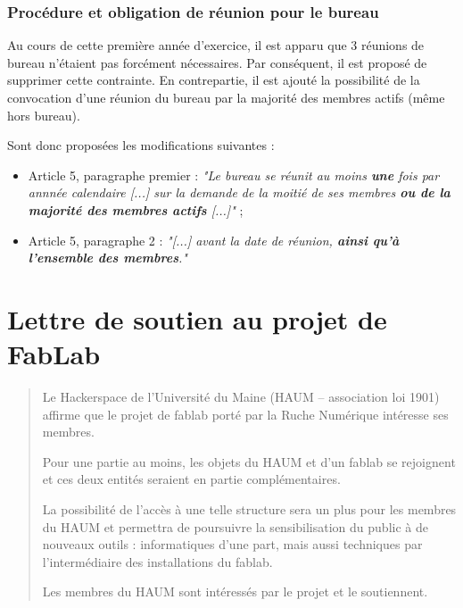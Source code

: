 \documentclass[11pt]{article}
\begin{document}
\subsubsection{Procédure et obligation de réunion pour le bureau}

Au cours de cette première année d'exercice, il est apparu que 3 réunions de bureau n'étaient pas forcément nécessaires. Par conséquent, il est proposé de supprimer cette contrainte. En contrepartie, il est ajouté la possibilité de la convocation d'une réunion du bureau par la majorité des membres actifs (même hors bureau).

Sont donc proposées les modifications suivantes :

\begin{itemize}
	\item Article 5, paragraphe premier : \textit{"Le bureau se réunit au moins \textbf{une} fois par annnée calendaire [...] sur la demande de la moitié de ses membres \textbf{ou de la majorité des membres actifs} [...]"} ;
    \item Article 5, paragraphe 2 : \textit{"[...] avant la date de réunion, \textbf{ainsi qu'à l'ensemble des membres}."}
\end{itemize}

\appendix %

\section*{Lettre de soutien au projet de FabLab}

\begin{quotation}
    Le Hackerspace de l'Université du Maine (HAUM -- association loi 1901) affirme que le projet de fablab porté par la
    Ruche Numérique intéresse ses membres.

    Pour une partie au moins, les objets du HAUM et d'un fablab se rejoignent et ces deux entités seraient en partie
    complémentaires.

    La possibilité de l'accès à une telle structure sera un plus pour les membres du HAUM et permettra de poursuivre la
    sensibilisation du public à de nouveaux outils : informatiques d'une part, mais aussi techniques par l'intermédiaire
    des installations du fablab.

    Les membres du HAUM sont intéressés par le projet et le soutiennent.


\end{quotation}
\end{document}
